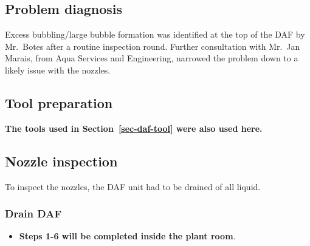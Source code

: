 \documentclass[
  12pt,
]{report}
\providecommand{\tightlist}{%
  \setlength{\itemsep}{0pt}\setlength{\parskip}{0pt}}\usepackage{longtable,booktabs,array}
\begin{document}
\hypertarget{problem-diagnosis}{%
\subsection{Problem diagnosis}\label{problem-diagnosis}}

Excess bubbling/large bubble formation was identified at the top of the
DAF by Mr.~Botes after a routine inspection round. Further consultation
with Mr.~Jan Marais, from Aqua Services and Engineering, narrowed the
problem down to a likely issue with the nozzles.

\hypertarget{tool-preparation}{%
\subsection{Tool preparation}\label{tool-preparation}}

\textbf{The tools used in Section~\ref{sec-daf-tool} were also used
here.}

\hypertarget{nozzle-inspection}{%
\subsection{Nozzle inspection}\label{nozzle-inspection}}

To inspect the nozzles, the DAF unit had to be drained of all liquid.

\hypertarget{drain-daf-1}{%
\subsubsection{Drain DAF}\label{drain-daf-1}}

\begin{itemize}
\tightlist
\item
  \textbf{Steps 1-6 will be completed inside the plant room}.
\end{itemize}
\end{document}
